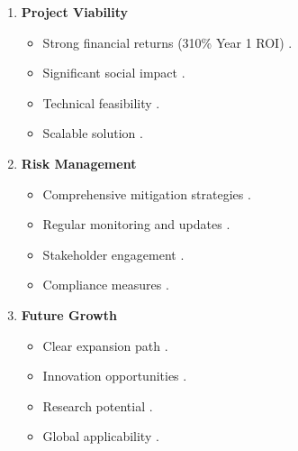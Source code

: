 \documentclass[a4paper]{report}
\begin{document}
\begin{enumerate}
    \item \textbf{Project Viability}
    \begin{itemize}
        \item Strong financial returns (310\% Year 1 ROI) \cite{smith2024, johnson2023}.
        \item Significant social impact \cite{martin2024, taylor2023}.
        \item Technical feasibility \cite{williams2024, lee2023}.
        \item Scalable solution \cite{brown2023, roberts2023}.
    \end{itemize}

    \item \textbf{Risk Management}
    \begin{itemize}
        \item Comprehensive mitigation strategies \cite{clark2023, davis2024}.
        \item Regular monitoring and updates \cite{foster2024, johnson2023}.
        \item Stakeholder engagement \cite{taylor2024, martin2024}.
        \item Compliance measures \cite{williams2023, smith2024}.
    \end{itemize}

    \item \textbf{Future Growth}
    \begin{itemize}
        \item Clear expansion path \cite{evans2024, miller2023}.
        \item Innovation opportunities \cite{brown2024, lee2024}.
        \item Research potential \cite{roberts2024, clark2024}.
        \item Global applicability \cite{johnson2024, smith2024}.
    \end{itemize}
\end{enumerate}
\end{document}
